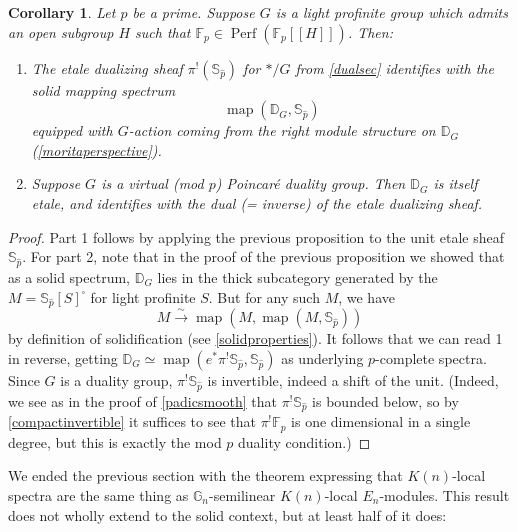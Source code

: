 \documentclass[12pt]{article}
\newtheorem{corollary}[theorem]{Corollary}
\newcommand{\on}{\operatorname}
\newcommand{\mbb}{\mathbb}
\newcommand{\wh}{\widehat}
\begin{document}
\begin{corollary}\label{compareduality}
Let $p$ be a prime.  Suppose $G$ is a light profinite group which admits an open subgroup $H$ such that $\mathbb{F}_p\in\on{Perf}(\mathbb{F}_p[[H]])$.  Then:
\begin{enumerate}
\item The etale dualizing sheaf $\pi^!(\mathbb{S}_{\wh{p}})$ for $\ast/G$ from \ref{dualsec} identifies with the solid mapping spectrum
$$\on{map}(\mathbb{D}_G,\mathbb{S}_{\wh{p}})$$
equipped with $G$-action coming from the right module structure on $\mathbb{D}_G$ (\ref{moritaperspective}).
\item Suppose $G$ is a virtual (mod $p$) Poincaré duality group.  Then $\mathbb{D}_G$ is itself etale, and identifies with the dual (= inverse) of the etale dualizing sheaf.
\end{enumerate}
\end{corollary}
\begin{proof}
Part 1 follows by applying the previous proposition to the unit etale sheaf $\mbb{S}_{\wh{p}}$.  For part 2, note that in the proof of the previous proposition we showed that as a solid spectrum, $\mathbb{D}_G$ lies in the thick subcategory generated by the $M=\mathbb{S}_{\wh{p}}[S]^\square$ for light profinite $S$.  But for any such $M$, we have
$$M\overset{\sim}{\rightarrow}\on{map}(M,\on{map}(M,\mbb{S}_{\wh{p}}))$$
by definition of solidification (see \ref{solidproperties}).  It follows that we can read 1 in reverse, getting $\mathbb{D}_G \simeq \on{map}(e^\ast\pi^!\mathbb{S}_{\wh{p}},\mbb{S}_{\wh{p}})$ as underlying $p$-complete spectra.  Since $G$ is a duality group, $\pi^!\mathbb{S}_{\wh{p}}$ is invertible, indeed a shift of the unit.  (Indeed, we see as in the proof of \ref{padicsmooth} that $\pi^!\mbb{S}_{\wh{p}}$ is bounded below, so by \ref{compactinvertible} it suffices to see that $\pi^!\mbb{F}_p$ is one dimensional in a single degree, but this is exactly the mod $p$ duality condition.)
\end{proof}


We ended the previous section with the theorem expressing that $K(n)$-local spectra are the same thing as $\mathbb{G}_n$-semilinear $K(n)$-local $E_n$-modules.  This result does not wholly extend to the solid context, but at least half of it does:
\end{document}
